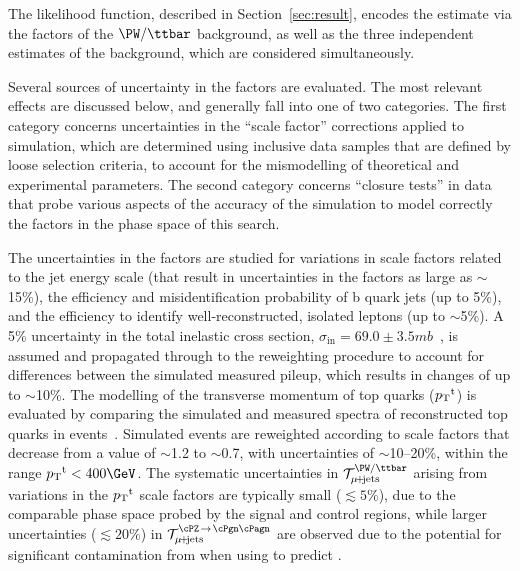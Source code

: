 The likelihood function, described in Section~\ref{sec:result},
encodes the estimate via the \tf factors of the $\PW/\ttbar$ background, as
well as the three independent estimates of the \znunu background,
which are considered simultaneously.

Several sources of uncertainty in the \tf factors are evaluated.  The most
relevant effects are discussed below, and generally fall into one of
two categories. The first category concerns uncertainties in the
``scale factor'' corrections applied to simulation, which are
determined using inclusive data samples that are defined by loose
selection criteria, to account for the mismodelling of theoretical and
experimental parameters. The second category concerns ``closure
tests'' in data that probe various aspects of the accuracy of the
simulation to model correctly the \tf factors in the phase space of this
search.

The uncertainties in the \tf factors are studied for variations in
scale factors related to the jet energy scale (that result in
uncertainties in the \tf factors as large as $\sim$15\%), the
efficiency and misidentification probability of b quark jets (up to
5\%), and the efficiency to identify well-reconstructed, isolated
leptons (up to $\sim$5\%). A 5\% uncertainty in the total inelastic
cross section, $\sigma_\text{in} = 69.0 \pm
3.5\unit{mb}$~\cite{Aaboud:2016mmw}, is assumed and propagated through
to the reweighting procedure to account for differences between the
simulated measured pileup, which results in changes of up to
$\sim$10\%. The modelling of the transverse momentum of top quarks
(${p_{\text T}}^\text{t}$) is evaluated by comparing the simulated and measured
\Pt spectra of reconstructed top quarks in \ttbar
events~\cite{Khachatryan:2015oqa}.  Simulated events are reweighted
according to scale factors that decrease from a value of $\sim$1.2 to
$\sim$0.7, with uncertainties of $\sim$10--20\%, within the range
$\Pt^\text{t} < 400\GeV$.
The systematic uncertainties in $\tf^\text{\PW/\ttbar}_{\mj}$ arising
from variations in the ${p_{\text T}}^\text{t}$ scale factors are typically
small ($\lesssim 5\%$), due to the comparable phase space probed by the
signal and control regions, while larger uncertainties
($\lesssim 20\%$) in $\tf^{\text{\znunu}}_{\mj}$ are observed due to
the potential for significant contamination from \ttbar when using
\wlj to predict \znunuj.

